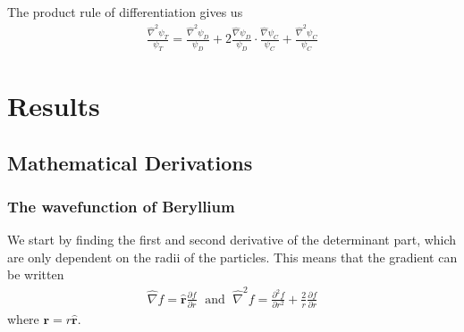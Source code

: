 \documentclass[twocolumn,12pt]{extarticle}
\newcommand{\eq}[1]{{\small\begin{align*}#1\end{align*}}}
\renewcommand\vec[1]{\mathbf{#1}}
\newcommand{\op}[1]{\hat{#1}}
\newcommand{\unit}[1]{\mathbf{\hat{#1}}}
\renewcommand{\thesubsection}{\Alph{subsection}.}
\begin{document}
The product rule of differentiation gives us
\eq{
  \frac{\op\nabla^2 \psi_T}{\psi_T} = 
  \frac{\op\nabla^2 \psi_D}{\psi_D}
    +2 \frac{\op\nabla \psi_D}{\psi_D}\cdot\frac{\op\nabla \psi_C}{\psi_C}
    +\frac{\op\nabla^2 \psi_C}{\psi_C}
}


\section{Results}

\appendix
\renewcommand{\thesubsection}{Appendix \Alph{subsection}:}
\renewcommand{\thesubsubsection}{\arabic{subsubsection}.}
\subsection{Mathematical Derivations}
\subsubsection{The wavefunction of Beryllium}
We start by finding the first and second derivative of the determinant part,
which are only dependent on the radii of the particles. This means that the gradient can be written 
\eq{
  \op\nabla f = \unit r \frac{\partial f}{\partial r}
  \;\text{ and }\;
  \op\nabla^2 f = \frac{\partial^2 f}{\partial r^2} 
    + \frac{2}{r}\frac{\partial f}{\partial r}
}
where $\vec r = r\unit r$.
  
\end{document}
